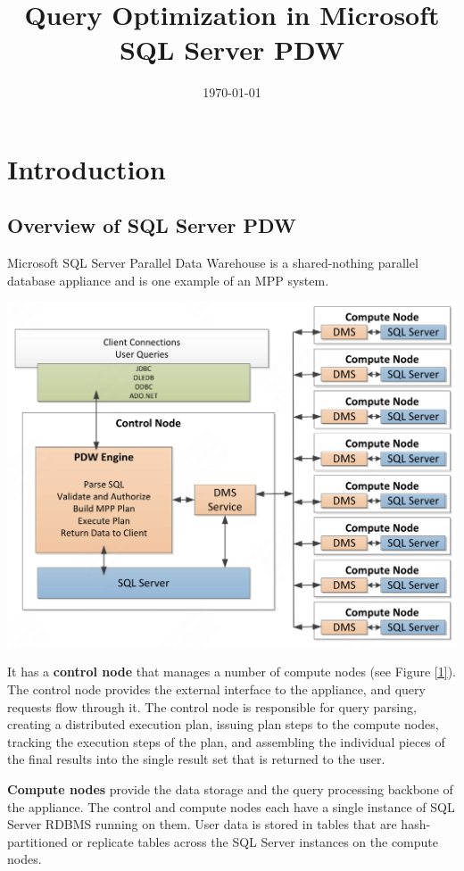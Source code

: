 \documentclass[11pt]{article}
\date{\today}
\title{Query Optimization in Microsoft SQL Server PDW}
\begin{document}
\maketitle
\section{Introduction}
\label{sec:orgb8317d6}
\subsection{Overview of SQL Server PDW}
\label{sec:org2e7758f}
Microsoft SQL Server Parallel Data Warehouse is a shared-nothing parallel database appliance and is
one example of an MPP system.

\begin{center}
\includegraphics[width=.8\textwidth]{../../images/papers/184.png}
\label{1}
\end{center}


It has a \textbf{control node} that manages a number of compute nodes (see Figure \ref{1}). The control node
provides the external interface to the appliance, and query requests flow through it. The control node
is responsible for query parsing, creating a distributed execution plan, issuing plan steps to the
compute nodes, tracking the execution steps of the plan, and assembling the individual pieces of the
final results into the single result set that is returned to the user.

\textbf{Compute nodes} provide the data storage and the query processing backbone of the appliance. The control
and compute nodes each have a single instance of SQL Server RDBMS running on them. User data is stored
in tables that are hash-partitioned or replicate tables across the SQL Server instances on the compute
nodes.
\end{document}

